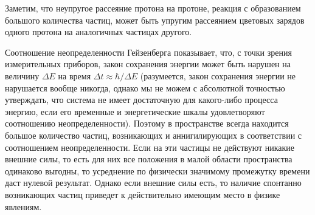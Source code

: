 \documentclass[12pt, a4paper]{article}
\begin{document}
Заметим, что неупругое рассеяние протона на протоне, реакция с образованием большого количества частиц, может быть упругим рассеянием цветовых зарядов одного протона на аналогичных частицах другого.



Соотношение неопределенности Гейзенберга показывает, что, с точки зрения измерительных приборов, закон сохранения энергии может быть нарушен на величину $\Delta E$ на время $\Delta t \approx \hbar/\Delta E$ (разумеется, закон сохранения энергии не нарушается вообще никогда, однако мы не можем с абсолютной точностью утверждать, что система не имеет достаточную для какого-либо процесса энергию, если его временные и энергетические шкалы удовлетворяют соотношению неопределенности). Поэтому в пространстве всегда находится большое количество частиц, возникающих и аннигилирующих в соответствии с соотношением неопределенности. Если на эти частицы не действуют никакие внешние силы, то есть для них все положения в малой области пространства одинаково выгодны, то усреднение по физически значимому промежутку времени даст нулевой результат. Однако если внешние силы есть, то наличие спонтанно возникающих частиц приведет к действительно имеющим место в физике явлениям. 

\end{document}
